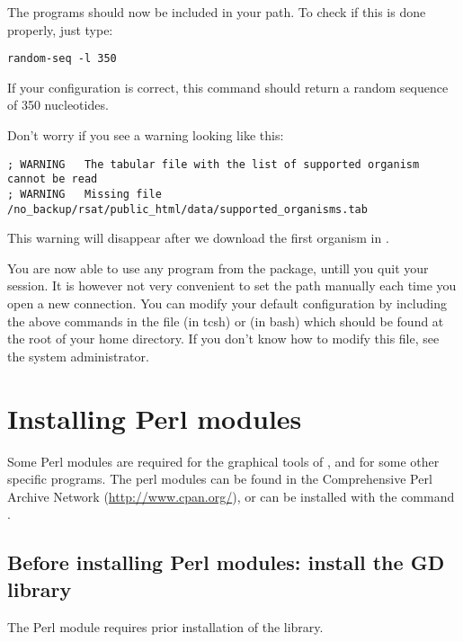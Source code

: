 \documentclass[12pt,a4paper, oneside]{scrreprt} %
\begin{document}
The \RSAT programs should now be included in your path.  To check if
this is done properly, just type:

\begin{lstlisting}
random-seq -l 350
\end{lstlisting}

If your configuration is correct, this command should return a random
sequence of 350 nucleotides.

Don't worry if you see a warning looking like this:

\begin{footnotesize}
\begin{verbatim}
; WARNING	The tabular file with the list of supported organism cannot be read
; WARNING	Missing file	/no_backup/rsat/public_html/data/supported_organisms.tab
\end{verbatim}
\end{footnotesize}

This warning will disappear after we download the first organism in
\RSAT.

You are now able to use any program from the \RSAT package, untill you
quit your session. It is however not very convenient to set the path
manually each time you open a new connection. You can modify your
default configuration by including the above commands in the file
 (in tcsh) or  (in bash) which should be
found at the root of your home directory. If you don't know how to
modify this file, see the system administrator.

\chapter{Installing Perl modules}
\label{chap:perl_modules}

Some Perl modules are required for the graphical tools of \RSAT, and
for some other specific programs. The perl modules can be found in the
Comprehensive Perl Archive Network (\url{http://www.cpan.org/}), or
can be installed with the command .

\section{Before installing Perl modules: install the GD library}

The Perl module  requires prior installation of the
 library.
\end{document}
